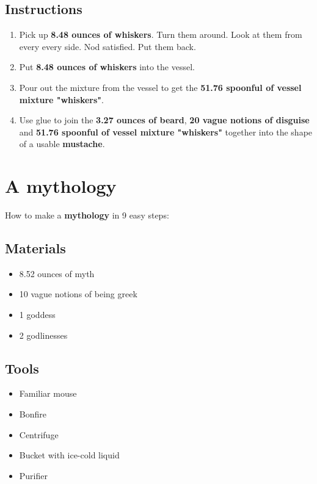 \documentclass{article}
\begin{document}
\subsection{Instructions}\begin{enumerate}
\item 
Pick up \textbf{8.48 ounces of whiskers}. Turn them around. Look at them from every every side. Nod satisfied. Put them back.
\item 
Put \textbf{8.48 ounces of whiskers} into the vessel.
\item 
Pour out the mixture from the vessel to get the \textbf{51.76 spoonful of vessel mixture "whiskers"}.
\item 
Use glue to join the \textbf{3.27 ounces of beard}, \textbf{20 vague notions of disguise} and \textbf{51.76 spoonful of vessel mixture "whiskers"} together into the shape of a usable \textbf{mustache}.
\end{enumerate}
\newpage
\section{A mythology}How to make a \textbf{mythology} in 9 easy steps:

\subsection{Materials}\begin{itemize}
\item 
8.52 ounces of myth
\item 
10 vague notions of being greek
\item 
1 goddess
\item 
2 godlinesses
\end{itemize}
\subsection{Tools}\begin{itemize}
\item 
Familiar mouse
\item 
Bonfire
\item 
Centrifuge
\item 
Bucket with ice-cold liquid
\item 
Purifier
\end{itemize}
\end{document}
